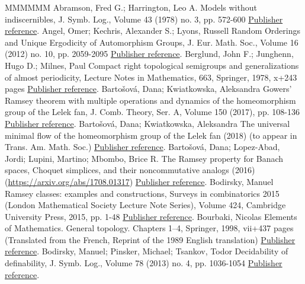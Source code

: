 \begin{thebibliography}{MMMMMM}
 Abramson, Fred G.; Harrington, Leo A. Models without indiscernibles, J. Symb. Log., Volume 43 (1978) no. 3, pp. 572-600 \href{https://ahl.centre-mersenne.org/item/AHL_2019__2__149_0/#AH}{Publisher reference}.
 Angel, Omer; Kechris, Alexander S.; Lyons, Russell Random Orderings and Unique Ergodicity of Automorphism Groups, J. Eur. Math. Soc., Volume 16 (2012) no. 10, pp. 2059-2095 \href{https://ahl.centre-mersenne.org/item/AHL_2019__2__149_0/#AKL}{Publisher reference}.
 Berglund, John F.; Junghenn, Hugo D.; Milnes, Paul Compact right topological semigroups and generalizations of almost periodicity, Lecture Notes in Mathematics, 663, Springer, 1978, x+243 pages \href{https://ahl.centre-mersenne.org/item/AHL_2019__2__149_0/#BJM}{Publisher reference}.
 Bartošová, Dana; Kwiatkowska, Aleksandra Gowers’ Ramsey theorem with multiple operations and dynamics of the homeomorphism group of the Lelek fan, J. Comb. Theory, Ser. A, Volume 150 (2017), pp. 108-136 \href{https://ahl.centre-mersenne.org/item/AHL_2019__2__149_0/#BaK2}{Publisher reference}.
 Bartošová, Dana; Kwiatkowska, Aleksandra The universal minimal flow of the homeomorphism group of the Lelek fan (2018) (to appear in Trans. Am. Math. Soc.) \href{https://ahl.centre-mersenne.org/item/AHL_2019__2__149_0/#BaK3}{Publisher reference}.
 Bartošová, Dana; Lopez-Abad, Jordi; Lupini, Martino; Mbombo, Brice R. The Ramsey property for Banach spaces, Choquet simplices, and their noncommutative analogs (2016) (\url{https://arxiv.org/abs/1708.01317}) \href{https://ahl.centre-mersenne.org/item/AHL_2019__2__149_0/#BLLM}{Publisher reference}.
 Bodirsky, Manuel Ramsey classes: examples and constructions, Surveys in combinatorics 2015 (London Mathematical Society Lecture Note Series), Volume 424, Cambridge University Press, 2015, pp. 1-48 \href{https://ahl.centre-mersenne.org/item/AHL_2019__2__149_0/#Bod2}{Publisher reference}.
 Bourbaki, Nicolas Elements of Mathematics. General topology. Chapters 1–4, Springer, 1998, vii+437 pages (Translated from the French, Reprint of the 1989 English translation) \href{https://ahl.centre-mersenne.org/item/AHL_2019__2__149_0/#Bou}{Publisher reference}.
 Bodirsky, Manuel; Pinsker, Michael; Tsankov, Todor Decidability of definability, J. Symb. Log., Volume 78 (2013) no. 4, pp. 1036-1054 \href{https://ahl.centre-mersenne.org/item/AHL_2019__2__149_0/#BPT}{Publisher reference}.

\end{thebibliography}
